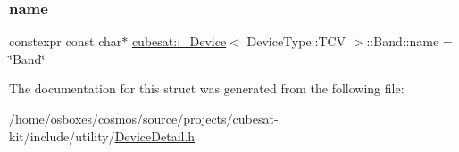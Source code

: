 \subsubsection{\texorpdfstring{name}{name}}
{\footnotesize\ttfamily constexpr const char$\ast$ \hyperlink{structcubesat_1_1__Device}{cubesat\+::\+\_\+\+Device}$<$ Device\+Type\+::\+T\+CV $>$\+::Band\+::name = \char`\"{}Band\char`\"{}\hspace{0.3cm}{\ttfamily [static]}}



The documentation for this struct was generated from the following file\+:\begin{DoxyCompactItemize}
\item 
/home/osboxes/cosmos/source/projects/cubesat-\/kit/include/utility/\hyperlink{DeviceDetail_8h}{Device\+Detail.\+h}\end{DoxyCompactItemize}
